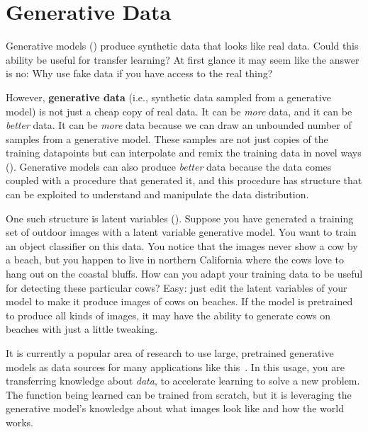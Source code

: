 


\section{Generative Data}

Generative models (\chap{\ref{chapter:generative_models}}) produce synthetic data that looks like real data. Could this ability be useful for transfer learning? At first glance it may seem like the answer is no: Why use fake data if you have access to the real thing?

However, \textbf{generative data} (i.e., synthetic data sampled from a generative model) is not just a cheap copy of real data. It can be \textit{more} data, and it can be \textit{better} data. It can be \textit{more} data because we can draw an unbounded number of samples from a generative model. These samples are not just copies of the training datapoints but can interpolate and remix the training data in novel ways (\chap{\ref{chapter:generative_models}}). Generative models can also produce \textit{better} data because the data comes coupled with a procedure that generated it, and this procedure has structure that can be exploited to understand and manipulate the data distribution.

One such structure is latent variables (\chap{\ref{chapter:generative_modeling_and_representation_learning}}). Suppose you have generated a training set of outdoor images with a latent variable generative model. You want to train an object classifier on this data. You notice that the images never show a cow by a beach, but you happen to live in northern California where the cows love to hang out on the coastal bluffs. How can you adapt your training data to be useful for detecting these particular cows? Easy: just edit the latent variables of your model to make it produce images of cows on beaches. If the model is pretrained to produce all kinds of images, it may have the ability to generate cows on beaches with just a little tweaking.

It is currently a popular area of research to use large, pretrained generative models as data sources for many applications like this~\cite{jahanian2021generative,he2022synthetic,brooks2022instructpix2pix}. In this usage, you are transferring knowledge about \textit{data}, to accelerate learning to solve a new problem. The function being learned can be trained from scratch, but it is leveraging the generative model's knowledge about what images look like and how the world works.

